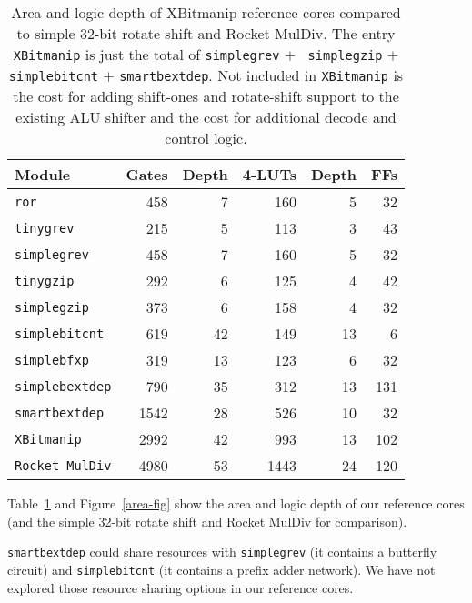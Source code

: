 \begin{table}[h]
\begin{center}
\begin{tabular}{l|rr|rr|r}
Module & Gates & Depth & 4-LUTs & Depth & FFs \\
\hline
{\tt ror} & 458 & 7 & 160 & 5 & 32 \\
\hline
{\tt tinygrev} & 215 & 5 & 113 & 3 & 43 \\
{\tt simplegrev} & 458 & 7 & 160 & 5 & 32 \\
\hline
{\tt tinygzip} & 292 & 6 & 125 & 4 & 42 \\
{\tt simplegzip} & 373 & 6 & 158 & 4 & 32 \\
\hline
{\tt simplebitcnt} & 619 & 42 & 149 & 13 & 6 \\
\hline
{\tt simplebfxp} & 319 & 13 & 123 & 6 & 32 \\
\hline
{\tt simplebextdep} & 790 & 35 & 312 & 13 & 131 \\
{\tt smartbextdep} & 1542 & 28 & 526 & 10 & 32 \\
\hline
{\tt XBitmanip} & 2992 & 42 & 993 & 13 & 102 \\
{\tt Rocket MulDiv} & 4980 & 53 & 1443 & 24 & 120 \\
\end{tabular}
\end{center}
\caption{Area and logic depth of XBitmanip reference cores compared to simple 32-bit rotate
shift and Rocket MulDiv. The entry {\tt XBitmanip} is just the total of {\tt simplegrev} $+$ {\tt
simplegzip} $+$ {\tt simplebitcnt} $+$ {\tt smartbextdep}. Not included in {\tt XBitmanip} is the
cost for adding shift-ones and rotate-shift support to the existing ALU shifter
and the cost for additional decode and control logic.}
\label{area-tab}
\end{table}

Table~\ref{area-tab} and Figure~\ref{area-fig} show the area and logic depth of
our reference cores (and the simple 32-bit rotate shift and Rocket MulDiv for
comparison).

{\tt smartbextdep} could share resources with {\tt simplegrev} (it contains
a butterfly circuit) and {\tt simplebitcnt} (it contains a prefix adder network).
We have not explored those resource sharing options in our reference cores.
